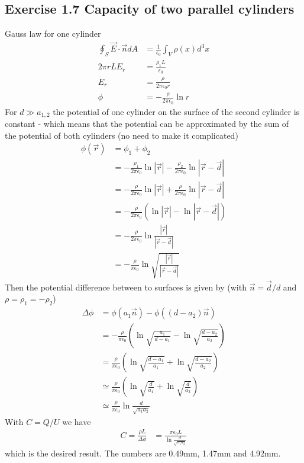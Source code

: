 \documentclass[10pt,a4paper]{book}
\theoremstyle{definition}
\begin{document}
\subsection{Exercise 1.7 Capacity of two parallel cylinders}Gauss law for one cylinder
\begin{align}
\oint_S\vec{E}\cdot\vec{n}dA&=\frac{1}{\epsilon_0}\int_V\rho(x)d^3x\\
2\pi rLE_r&=\frac{\rho_{1} L}{\epsilon_0}\\
E_r&=\frac{\rho}{2\pi\epsilon_0r}\\
\phi&=-\frac{\rho}{2\pi\epsilon_0}\ln r
\end{align}
For $d\gg a_{1,2}$ the potential of one cylinder on the surface of the second cylinder is constant - which means that the potential can be approximated by the sum of the potential of both cylinders (no need to make it complicated)
\begin{align}
\phi(\vec{r})&=\phi_1+\phi_2\\
&=-\frac{\rho_{1}}{2\pi\epsilon_0}\ln |\vec{r}|-\frac{\rho_{2}}{2\pi\epsilon_0}\ln |\vec{r}-\vec{d}|\\
&=-\frac{\rho}{2\pi\epsilon_0}\ln |\vec{r}|+\frac{\rho}{2\pi\epsilon_0}\ln |\vec{r}-\vec{d}|\\
&=-\frac{\rho}{2\pi\epsilon_0}\left(\ln |\vec{r}|-\ln |\vec{r}-\vec{d}|\right)\\
&=-\frac{\rho}{2\pi\epsilon_0}\ln \frac{|\vec{r}|}{|\vec{r}-\vec{d}|}\\
&=-\frac{\rho}{\pi\epsilon_0}\ln \sqrt{\frac{|\vec{r}|}{|\vec{r}-\vec{d}|}}
\end{align}
Then the potential difference between to surfaces is given by (with $\vec{n}=\vec{d}/d$ and $\rho=\rho_1=-\rho_2$)
\begin{align}
\Delta\phi&=\phi(a_1\vec{n})-\phi((d-a_2)\vec{n})\\
&=-\frac{\rho}{\pi\epsilon_0}\left(\ln \sqrt{\frac{a_1}{d-a_1}}-\ln \sqrt{\frac{d-a_2}{a_2}}\right)\\
&=\frac{\rho}{\pi\epsilon_0}\left(\ln \sqrt{\frac{d-a_1}{a_1}}+\ln \sqrt{\frac{d-a_2}{a_2}}\right)\\
&\simeq\frac{\rho}{\pi\epsilon_0}\left(\ln \sqrt{\frac{d}{a_1}}+\ln \sqrt{\frac{d}{a_2}}\right)\\
&\simeq\frac{\rho}{\pi\epsilon_0}\ln \frac{d}{\sqrt{a_1a_2}}
\end{align}
With $C=Q/U$ we have
\begin{align}
C=\frac{\rho L}{\Delta\phi}&=\frac{\pi\epsilon_0L}{\ln \frac{d}{\sqrt{a_1a_2}}}
\end{align}
which is the desired result. The numbers are 0.49mm, 1.47mm and 4.92mm.
\end{document}
